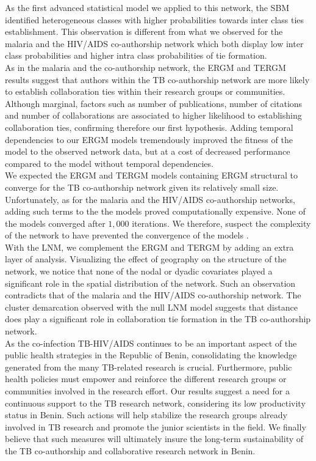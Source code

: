 As the first advanced statistical model we applied to this network, the SBM identified heterogeneous classes with higher probabilities towards inter class ties establishment. This observation is different from what we observed for the malaria and the HIV/AIDS co-authorship network which both display low inter class probabilities and higher intra class probabilities of tie formation. \\
As in the malaria and the co-authorship network, the ERGM and TERGM results suggest that authors within the TB co-authorship network are more likely to establish collaboration ties within their research groups or communities. Although marginal, factors such as number of publications, number of citations and number of collaborations are associated to higher likelihood to establishing collaboration ties, confirming therefore our first hypothesis. Adding temporal dependencies to our ERGM models tremendously improved the fitness of the model to the observed network data, but at a cost of decreased performance compared to the model without temporal dependencies.\\
We expected the ERGM and TERGM models containing ERGM structural to converge for the TB co-authorship network given its relatively small size. Unfortunately, as for the malaria and the HIV/AIDS co-authorship networks, adding such terms to the the models proved computationally expensive. None of the models converged after $1,000$ iterations. We therefore, suspect the complexity of the network to have prevented the convergence of the models \cite{schmid_exponential_2017}. \\ 
With the LNM, we complement the ERGM and TERGM by adding an extra layer of analysis. Visualizing the effect of geography on the structure of the network, we notice that none of the nodal or dyadic covariates played a significant role in the spatial distribution of the network. Such an observation contradicts that of the malaria and the HIV/AIDS co-authorship network. The cluster demarcation observed with the null LNM model suggests that distance does play a significant role in collaboration tie formation in the TB co-authorship network. \\
As the co-infection TB-HIV/AIDS continues to be an important aspect of the public health strategies in the Republic of Benin, consolidating the knowledge generated from the many TB-related research is crucial. Furthermore, public health policies must empower and reinforce the different research groups or communities involved in the research effort. Our results suggest a need for a continuous support to the TB research network, considering its low productivity status in Benin. Such actions will help stabilize the research groups already involved in TB research and promote the junior scientists in the field. We finally believe that such measures will ultimately insure the long-term sustainability of the TB co-authorship and collaborative research network in Benin.

